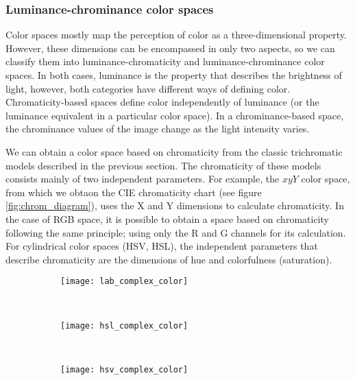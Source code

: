 \subsubsection{Luminance-chrominance color spaces}%

Color spaces mostly map the perception of color as a three-dimensional property. However, these dimensions can be encompassed in only two aspects, so we can classify them into luminance-chromaticity and luminance-chrominance color spaces. In both cases, luminance is the property that describes the brightness of light, however, both categories have different ways of defining color. Chromaticity-based spaces define color independently of luminance (or the luminance equivalent in a particular color space). In a chrominance-based space, the chrominance values of the image change as the light intensity varies.
  
We can obtain a color space based on chromaticity from the classic trichromatic models described in the previous section. The chromaticity of these models consists mainly of two independent parameters. For example, the $xyY$ color space, from which we obtaon the CIE chromaticity chart (see figure \ref{fig:chrom_diagram}), uses the X and Y dimensions to calculate chromaticity. In the case of RGB space, it is possible to obtain a space based on chromaticity following the same principle; using only the R and G channels for its calculation. For cylindrical color spaces (HSV, HSL), the independent parameters that describe chromaticity are the dimensions of hue and colorfulness (saturation).

\begin{figure}[!ht] 
	\centering
	\begin{subfigure}[b]{0.48\textwidth}
		\centering
		\texttt{[image: lab\_complex\_color]}
		\caption{}	
		\label{fig:lab_complex_color}
	\end{subfigure}
	~%
	\begin{subfigure}[b]{0.48\textwidth}
		\centering
		\texttt{[image: hsl\_complex\_color]}
		\caption{}	
		\label{fig:hsl_complex_color}
	\end{subfigure}
	~%
	\begin{subfigure}[b]{0.48\textwidth}
		\centering
		\texttt{[image: hsv\_complex\_color]}
		\caption{ }	
		\label{fig:hsv_complex_color}
	\end{subfigure}
	
	\caption{}
	\label{fig:complex_color_spaces}
\end{figure}

